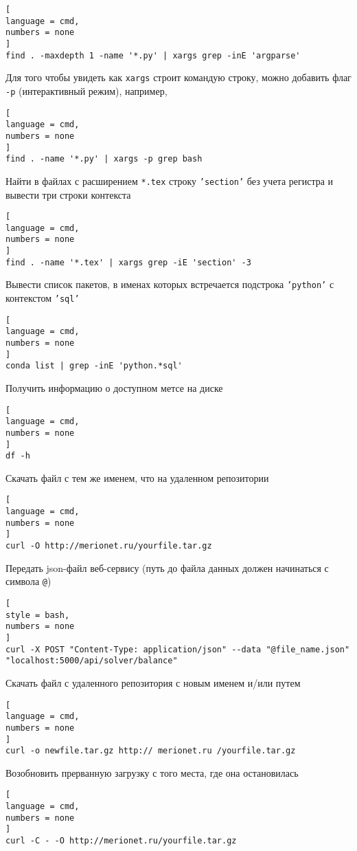 \documentclass[%
	11pt,
	a4paper,
	utf8,
		]{article}
\begin{document}
\begin{lstlisting}[
language = cmd,
numbers = none
]
find . -maxdepth 1 -name '*.py' | xargs grep -inE 'argparse'
\end{lstlisting} 

Для того чтобы увидеть как \texttt{xargs} строит командую строку, можно добавить флаг \texttt{-p} (интерактивный режим), например,
\begin{lstlisting}[
language = cmd,
numbers = none
]
find . -name '*.py' | xargs -p grep bash
\end{lstlisting} 

Найти в файлах с расширением \texttt{*.tex} строку \texttt{'section'} без учета регистра и вывести три строки контекста
\begin{lstlisting}[
language = cmd,
numbers = none
]
find . -name '*.tex' | xargs grep -iE 'section' -3
\end{lstlisting}

Вывести список пакетов, в именах которых встречается подстрока \texttt{'python'} с контекстом \texttt{'sql'}
\begin{lstlisting}[
language = cmd,
numbers = none
]
conda list | grep -inE 'python.*sql'
\end{lstlisting}

Получить информацию о доступном метсе на диске
\begin{lstlisting}[
language = cmd,
numbers = none
]
df -h
\end{lstlisting}

Скачать файл с тем же именем, что на удаленном репозитории 
\begin{lstlisting}[
language = cmd,
numbers = none
]
curl -O http://merionet.ru/yourfile.tar.gz
\end{lstlisting}

Передать json-файл веб-сервису (путь до файла данных должен начинаться с символа \verb|@|)
\begin{lstlisting}[
style = bash,
numbers = none
]
curl -X POST "Content-Type: application/json" --data "@file_name.json" "localhost:5000/api/solver/balance"
\end{lstlisting}

Скачать файл с удаленного репозитория с новым именем и/или путем
\begin{lstlisting}[
language = cmd,
numbers = none
]
curl -o newfile.tar.gz http:// merionet.ru /yourfile.tar.gz
\end{lstlisting}

Возобновить прерванную загрузку с того места, где она остановилась
\begin{lstlisting}[
language = cmd,
numbers = none
]
curl -C - -O http://merionet.ru/yourfile.tar.gz
\end{lstlisting}
\end{document}
